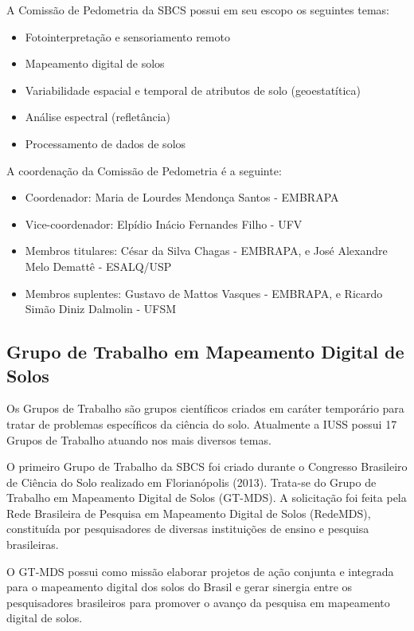 A Comissão de Pedometria da SBCS possui em seu escopo os seguintes temas:

\begin{itemize}
 \item Fotointerpretação e sensoriamento remoto
 \item Mapeamento digital de solos
 \item Variabilidade espacial e temporal de atributos de solo (geoestatítica)
 \item Análise espectral (refletância)
 \item Processamento de dados de solos
\end{itemize}

A coordenação da Comissão de Pedometria é a seguinte:

\begin{itemize}
 \item Coordenador: Maria de Lourdes Mendonça Santos - EMBRAPA
 \item Vice-coordenador: Elpídio Inácio Fernandes Filho - UFV
 \item Membros titulares: César da Silva Chagas - EMBRAPA, e José Alexandre Melo Demattê - ESALQ/USP
 \item Membros suplentes: Gustavo de Mattos Vasques - EMBRAPA, e Ricardo Simão Diniz Dalmolin - UFSM
\end{itemize}

\subsection{Grupo de Trabalho em Mapeamento Digital de Solos}

Os Grupos de Trabalho são grupos científicos criados em caráter temporário para tratar de problemas específicos da ciência do solo. Atualmente a IUSS possui 17 Grupos de Trabalho atuando nos mais diversos temas.

O primeiro Grupo de Trabalho da SBCS foi criado durante o Congresso Brasileiro de Ciência do Solo realizado em Florianópolis (2013). Trata-se do Grupo de Trabalho em Mapeamento Digital de Solos (GT-MDS). A solicitação foi feita pela Rede Brasileira de Pesquisa em Mapeamento Digital de Solos (RedeMDS), constituída por pesquisadores de diversas instituições de ensino e pesquisa brasileiras.

O GT-MDS possui como missão elaborar projetos de ação conjunta e integrada para o mapeamento digital dos solos do Brasil e gerar sinergia entre os pesquisadores brasileiros para promover o avanço da pesquisa em mapeamento digital de solos.

